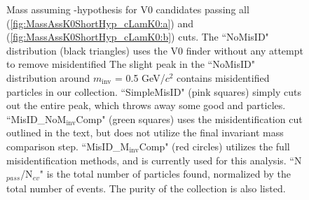 \documentclass[../AnalysisNoteJBuxton.tex]{subfiles}
\begin{document}
\begin{figure}[h!]
  \centering
  \caption[\Ks contamination in \LamALam collection]{Mass assuming \Ks-hypothesis for V0 candidates passing all \Lam (\ref{fig:MassAssK0ShortHyp_cLamK0:a}) and \ALam (\ref{fig:MassAssK0ShortHyp_cLamK0:b}) cuts.
  The ``NoMisID" distribution (black triangles) uses the V0 finder without any attempt to remove misidentified \Ks
  The slight peak in the ``NoMisID" distribution around $m_{\mathrm{inv}}$ = 0.5 GeV/$c^{2}$ contains misidentified \Ks particles in our \LamALam collection.  
  ``SimpleMisID" (pink squares) simply cuts out the entire peak, which throws away some good \Lam and \ALam particles.
  ``MisID\_NoM$_{\mathrm{inv}}$Comp" (green squares) uses the misidentification cut outlined in the text, but does not utilize the final invariant mass comparison step.
  ``MisID\_M$_{\mathrm{inv}}$Comp" (red circles) utilizes the full misidentification methods, and is currently used for this analysis.  
  ``N$_{pass}$/N$_{ev}$" is the total number of \LamALam particles found, normalized by the total number of events.  The purity of the collection is also listed.}
  \label{fig:MassAssK0ShortHyp_cLamK0}
\end{figure}
\end{document}
